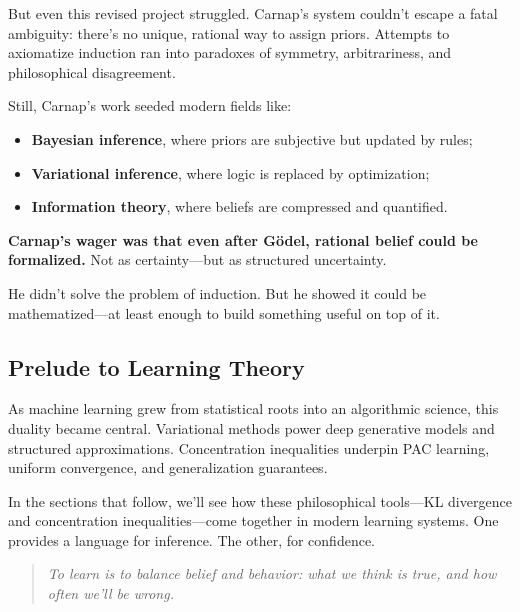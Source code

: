 \begin{tcolorbox}[colback=gray!5!white, colframe=black!75!white, title={Historical Sidebar: Carnap and the Collapse-Proof Dream of Inductive Logic}]
    \medskip
    
    But even this revised project struggled. Carnap's system couldn’t escape a fatal ambiguity: there’s no unique, rational way to assign priors. Attempts to axiomatize induction ran into paradoxes of symmetry, arbitrariness, and philosophical disagreement.
    
    Still, Carnap’s work seeded modern fields like:
    
    \begin{itemize}
        \item \textbf{Bayesian inference}, where priors are subjective but updated by rules;
        \item \textbf{Variational inference}, where logic is replaced by optimization;
        \item \textbf{Information theory}, where beliefs are compressed and quantified.
    \end{itemize}
    
    \medskip
    
    \textbf{Carnap’s wager was that even after Gödel, rational belief could be formalized.}  
    Not as certainty—but as structured uncertainty.
    
    He didn’t solve the problem of induction.  
    But he showed it could be mathematized—at least enough to build something useful on top of it.
    
\end{tcolorbox}
        

\subsection{Prelude to Learning Theory}

As machine learning grew from statistical roots into an algorithmic science, this duality became central. Variational methods power deep generative models and structured approximations. Concentration inequalities underpin PAC learning, uniform convergence, and generalization guarantees.

In the sections that follow, we’ll see how these philosophical tools—KL divergence and concentration inequalities—come together in modern learning systems. One provides a language for inference. The other, for confidence.

\begin{quote}
\textit{To learn is to balance belief and behavior: what we think is true, and how often we’ll be wrong.}
\end{quote}










